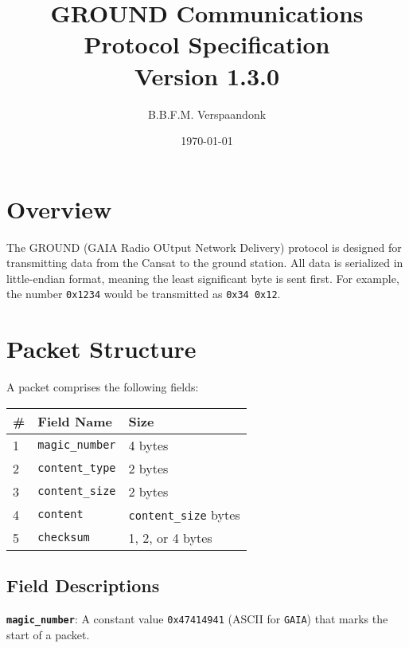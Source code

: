 \documentclass[a4paper]{article}
\title{GROUND Communications Protocol Specification\\ \large Version 1.3.0}
\date{\today}
\author{B.B.F.M. Verspaandonk}
\begin{document}
\maketitle

\tableofcontents

\section{Overview}
The GROUND (GAIA Radio OUtput Network Delivery) protocol is designed for transmitting data from the Cansat to the ground station. All data is serialized in little-endian format, meaning the least significant byte is sent first. For example, the number \texttt{0x1234} would be transmitted as \texttt{0x34 0x12}.

\section{Packet Structure}
A packet comprises the following fields:
\begin{longtable}{@{}lll@{}}
\toprule
\# & Field Name         & Size                \\
\midrule
1  & \texttt{magic\_number}      & 4 bytes             \\
2  & \texttt{content\_type} & 2 bytes             \\
3  & \texttt{content\_size} & 2 bytes             \\
4  & \texttt{content}     & \texttt{content\_size} bytes \\
5  & \texttt{checksum}    & 1, 2, or 4 bytes      \\
\bottomrule
\end{longtable}

\subsection{Field Descriptions}
\textbf{\texttt{magic\_number}}: A constant value \texttt{0x47414941} (ASCII for \texttt{GAIA}) that marks the start of a packet.
\end{document}
